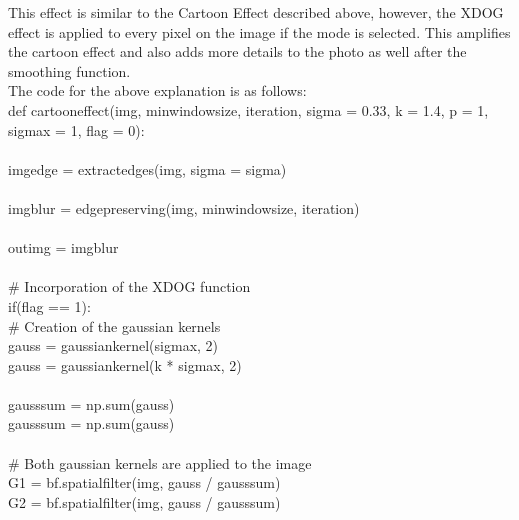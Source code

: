 \documentclass{article}
\begin{document}
	This effect is similar to the Cartoon Effect described above, however, the XDOG effect is applied to every pixel on the image if the mode is selected. This amplifies the cartoon effect and also adds more details to the photo as well after the smoothing function.\\
	
	The code for the above explanation is as follows:\\
	
	\noindent def cartoon\textunderscore effect(img, min\textunderscore window\textunderscore size, iteration, sigma = 0.33, k = 1.4, p = 1, sigma\textunderscore x = 1, flag = 0):\\
	\\
	\indent img\textunderscore edge = extract\textunderscore edges(img, sigma = sigma)\\
	\\
	\indent img\textunderscore blur = edge\textunderscore preserving(img, min\textunderscore window\textunderscore size, iteration)\\
	\\
	\indent out\textunderscore img = img\textunderscore blur\\
	\\
	\indent \# Incorporation of the XDOG function\\
	\indent if(flag == 1):\\
	\indent \indent \#       Creation of the gaussian kernels\\
	\indent \indent gauss = gaussian\textunderscore kernel(sigma\textunderscore x, 2)\\
	\indent \indent gauss = gaussian\textunderscore kernel(k * sigma\textunderscore x, 2)\\
	\\
	\indent \indent gauss\textunderscore sum = np.sum(gauss)\\
	\indent \indent gauss\textunderscore sum = np.sum(gauss)\\
	\\
	\indent \indent \# Both gaussian kernels are applied to the image\\
	\indent \indent G1 = bf.spatial\textunderscore filter(img, gauss / gauss\textunderscore sum)\\
	\indent \indent G2 = bf.spatial\textunderscore filter(img, gauss / gauss\textunderscore sum)\\
\end{document}
